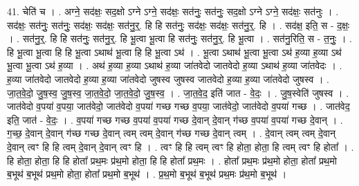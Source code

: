 \documentclass[17pt]{extarticle}
\begin{document}
41. चेति॑ च । . अग्ने॒ सद॑क्षः॒ सद॒क्षो ऽग्ने ऽग्ने॒ सद॑क्षः॒ सत॑नुः॒ सत॑नुः॒ सद॒क्षो ऽग्ने ऽग्ने॒ सद॑क्षः॒ सत॑नुः । . सद॑क्षः॒ सत॑नुः॒ सत॑नुः॒ सद॑क्षः॒ सद॑क्षः॒ सत॑नु॒र्॒. हि हि सत॑नुः॒ सद॑क्षः॒ सद॑क्षः॒ सत॑नु॒र्॒. हि । . सद॑क्ष॒ इति॒ स - द॒क्षः॒ । . सत॑नु॒र्॒. हि हि सत॑नुः॒ सत॑नु॒र्॒. हि भू॒त्वा भू॒त्वा हि सत॑नुः॒ सत॑नु॒र्॒. हि भू॒त्वा । . सत॑नु॒रिति॒ स - त॒नुः॒ । . हि भू॒त्वा भू॒त्वा हि हि भू॒त्वा ऽथाथ॑ भू॒त्वा हि हि भू॒त्वा ऽथ॑ । . भू॒त्वा ऽथाथ॑ भू॒त्वा भू॒त्वा ऽथ॑ ह॒व्या ह॒व्या ऽथ॑ भू॒त्वा भू॒त्वा ऽथ॑ ह॒व्या । . अथ॑ ह॒व्या ह॒व्या ऽथाथ॑ ह॒व्या जा॑तवेदो जातवेदो ह॒व्या ऽथाथ॑ ह॒व्या जा॑तवेदः । . ह॒व्या जा॑तवेदो जातवेदो ह॒व्या ह॒व्या जा॑तवेदो जुषस्व जुषस्व जातवेदो ह॒व्या ह॒व्या जा॑तवेदो जुषस्व । . जा॒त॒वे॒दो॒ जु॒ष॒स्व॒ जु॒ष॒स्व॒ जा॒त॒वे॒दो॒ जा॒त॒वे॒दो॒ जु॒ष॒स्व॒ । . जा॒त॒वे॒द॒ इति॑ जात - वे॒दः॒ । . जु॒ष॒स्वेति॑ जुषस्व । . जात॑वेदो व॒पया॑ व॒पया॒ जात॑वेदो॒ जात॑वेदो व॒पया॑ गच्छ गच्छ व॒पया॒ जात॑वेदो॒ जात॑वेदो व॒पया॑ गच्छ । . जात॑वेद॒ इति॒ जात॑ - वे॒दः॒ । . व॒पया॑ गच्छ गच्छ व॒पया॑ व॒पया॑ गच्छ दे॒वान् दे॒वान् ग॑च्छ व॒पया॑ व॒पया॑ गच्छ दे॒वान् । . ग॒च्छ॒ दे॒वान् दे॒वान् ग॑च्छ गच्छ दे॒वान् त्वम् त्वम् दे॒वान् ग॑च्छ गच्छ दे॒वान् त्वम् । . दे॒वान् त्वम् त्वम् दे॒वान् दे॒वान् त्वꣳ हि हि त्वम् दे॒वान् दे॒वान् त्वꣳ हि । . त्वꣳ हि हि त्वम् त्वꣳ हि होता॒ होता॒ हि त्वम् त्वꣳ हि होता᳚ । . हि होता॒ होता॒ हि हि होता᳚ प्रथ॒मः प्र॑थ॒मो होता॒ हि हि होता᳚ प्रथ॒मः । . होता᳚ प्रथ॒मः प्र॑थ॒मो होता॒ होता᳚ प्रथ॒मो ब॒भूथ॑ ब॒भूथ॑ प्रथ॒मो होता॒ होता᳚ प्रथ॒मो ब॒भूथ॑ । . प्र॒थ॒मो ब॒भूथ॑ ब॒भूथ॑ प्रथ॒मः प्र॑थ॒मो ब॒भूथ॑ । \newline
\end{document}
